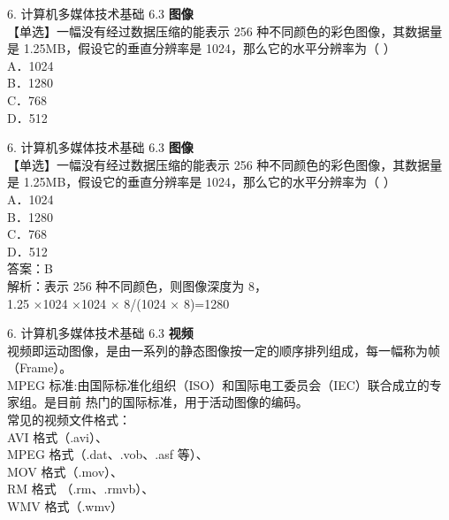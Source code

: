 \documentclass[aspectratio=169]{beamer}
\begin{document}
\begin{frame}[t]{6. 计算机多媒体技术基础} \vspace{20pt}
    6.3 \textbf{图像}\\
    【单选】一幅没有经过数据压缩的能表示 256 种不同颜色的彩色图像，其数据量是
1.25MB，假设它的垂直分辨率是 1024，那么它的水平分辨率为（ ）\\
A．1024\\ B．1280\\ C．768\\ D．512\\
\end{frame}

\begin{frame}[t]{6. 计算机多媒体技术基础} \vspace{20pt}
    6.3 \textbf{图像}\\
    【单选】一幅没有经过数据压缩的能表示 256 种不同颜色的彩色图像，其数据量是
1.25MB，假设它的垂直分辨率是 1024，那么它的水平分辨率为（ ）\\
A．1024\\ B．1280\\ C．768\\ D．512\\
答案：B\\
解析：表示 256 种不同颜色，则图像深度为 8，\\
1.25 ×1024 ×1024 × 8/(1024 × 8)=1280\\
\end{frame}



\begin{frame}[t]{6. 计算机多媒体技术基础} \vspace{20pt}
    6.3 \textbf{视频}\\
    视频即运动图像，是由一系列的静态图像按一定的顺序排列组成，每一幅称为帧（Frame）。\\
MPEG 标准:由国际标准化组织（ISO）和国际电工委员会（IEC）联合成立的专家组。是目前
热门的国际标准，用于活动图像的编码。\\
常见的视频文件格式：\\
AVI 格式（.avi）、\\
MPEG 格式（.dat、.vob、.asf 等）、\\
MOV 格式（.mov）、\\
RM 格式 （.rm、.rmvb）、\\
WMV 格式（.wmv）\\
\end{frame}
\end{document}
